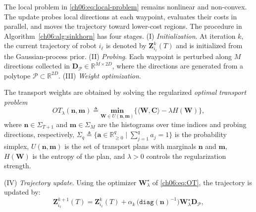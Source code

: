 The local problem in \eqref{ch06:eq:local-problem} remains nonlinear and
non-convex. 
The update probes local directions at each waypoint, evaluates their costs in
parallel, and moves the trajectory toward lower-cost regions. The procedure in
Algorithm~\ref{ch06:alg:sinkhorn} has four stages.
(I) \emph{Initialization}.
At iteration $k$, the current trajectory of robot $i_\ell$ is denoted by
$\mathbf{Z}_{i_\ell}^{k}(T)$ and is initialized from the
Gaussian-process prior.
(II) \emph{Probing}.
Each waypoint is perturbed along $M$ directions collected in
$\boldsymbol{D}_{\mathcal{P}}\in\mathbb{R}^{M\times 2D}$, where the
directions are generated from a polytope
$\mathcal{P}\subset\mathbb{R}^{2D}$.
(III) \emph{Weight optimization}.
\begin{revision}
The transport weights are obtained by solving the regularized \emph{optimal
transport problem}
\begin{equation}
\label{ch06:eq:OT}
OT_{\lambda}(\boldsymbol{n},\boldsymbol{m})\triangleq
\underset{\boldsymbol{W}\in U(\boldsymbol{n},\boldsymbol{m})}
{\textbf{min}}
\Big\{
\langle \boldsymbol{W},\boldsymbol{C}\rangle
-\lambda H(\boldsymbol{W})
\Big\},
\end{equation}
where
$\boldsymbol{n}\in\Sigma_{T+1}$ and $\boldsymbol{m}\in\Sigma_M$ are the
histograms over time indices and probing directions, respectively,
$\Sigma_q\triangleq
\{\mathbf{a}\in\mathbb{R}_{\geq 0}^{q}\mid
\sum_{j=1}^{q} a_j=1\}$ is the probability simplex,
$U(\boldsymbol{n},\boldsymbol{m})$ is the set of transport plans with
marginals $\boldsymbol{n}$ and $\boldsymbol{m}$,
$H(\boldsymbol{W})$ is the entropy of the plan, and $\lambda>0$
controls the regularization strength.
\end{revision}
(IV) \emph{Trajectory update}.
Using the optimizer $\boldsymbol{W}_\lambda^\star$ of
\eqref{ch06:eq:OT}, the trajectory is updated by:
\begin{equation}
\label{ch06:eq:sinkhorn}
\mathbf{Z}_{i_\ell}^{k+1}(T)
=
\mathbf{Z}_{i_\ell}^{k}(T)
+
\alpha_k\,
\big(\texttt{diag}(\boldsymbol{n})^{-1}\big)
\boldsymbol{W}_\lambda^\star
\boldsymbol{D}_{\mathcal{P}},
\end{equation}
